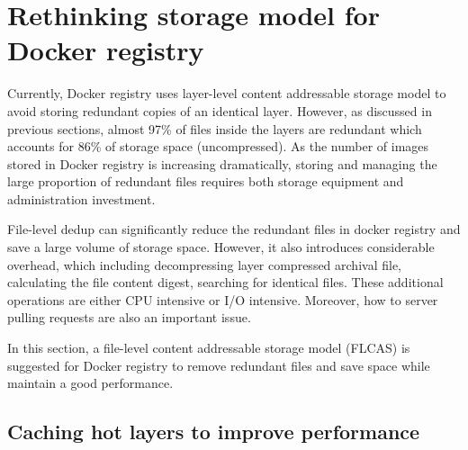 \section{Rethinking storage model for Docker registry}
\label{sec:file_adressable}

Currently, Docker registry uses layer-level content addressable storage model to avoid storing redundant copies of an identical layer. 
However, as discussed in previous sections, almost 97\% of files inside the layers are redundant which accounts for 86\% of storage space (uncompressed). 
As the number of images stored in Docker registry is increasing dramatically, 
storing and managing the large proportion of redundant files requires both storage equipment and administration investment. 

File-level dedup can significantly reduce the redundant files in docker registry and save a large volume of storage space.
However, it also introduces considerable overhead, which including decompressing layer compressed archival file, calculating the file content digest, searching for identical files. These additional operations are either CPU intensive or I/O intensive. Moreover, how to server pulling requests are also an important issue. 

In this section, a file-level content addressable storage model (FLCAS) is suggested for Docker registry to remove redundant files and save space while maintain a good performance.
%

\subsection{Caching hot layers to improve performance}
\label{subsec:FLCAS}

